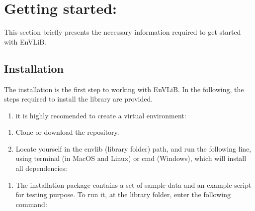 \documentclass[a4paper,11pt,english]{sphinxmanual}
\begin{document}
\chapter{Getting started:}
\label{\detokenize{index:getting-started}}
\sphinxAtStartPar
This section briefly presents the necessary information required to get started with EnVLiB.

\sphinxstepscope


\section{Installation}
\label{\detokenize{gStarted:installation}}\label{\detokenize{gStarted::doc}}
\sphinxAtStartPar
The installation is the first step to working with EnVLiB. In the following, the steps required to install the library are provided.
\begin{enumerate}
%
\setcounter{enumi}{-1}
\item {} 
\sphinxAtStartPar
it is highly recomended to create a virtual environment:

\end{enumerate}

\begin{sphinxVerbatim}[commandchars=\\\{\}]
   
  
\end{sphinxVerbatim}
\begin{enumerate}
%
\item {} 
\sphinxAtStartPar
Clone or download the repository.

\item {} 
\sphinxAtStartPar
Locate yourself in the envlib (library folder) path, and run the following line, using terminal (in MacOS and Linux) or cmd (Windows), which will install all dependencies:

\end{enumerate}

\begin{sphinxVerbatim}[commandchars=\\\{\}]
  
\end{sphinxVerbatim}
\begin{enumerate}
%
\setcounter{enumi}{2}
\item {} 
\sphinxAtStartPar
The installation package contains a set of sample data and an example script for testing purpose. To run it, at the library folder, enter the following command:

\end{enumerate}
\end{document}
